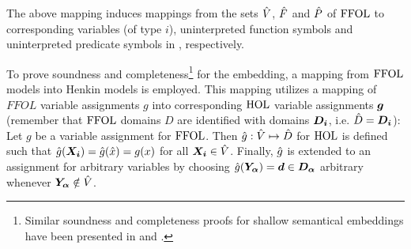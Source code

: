 The above mapping induces mappings from the sets $\hat{V}$, $\hat{F}$ and $\hat{P}$
of $\text{\textrm{FFOL}}$ to corresponding variables (of type $i$), uninterpreted function
symbols and uninterpreted predicate symbols in \HOL, respectively.

To prove soundness and completeness\footnote{Similar soundness and completeness proofs for
  shallow semantical embeddings have been presented in \cite{C37} and
  \cite{J31}.} for the embedding, a
mapping from $\text{\textrm{FFOL}}$ models into Henkin models is
employed.
This mapping utilizes a mapping of $FFOL$ variable
assignments $g$ into corresponding $\text{\textrm{HOL}}$ variable assignments
$\boldsymbol{g}$ (remember that $\text{\textrm{FFOL}}$  domains $D$ are  identified with 
\HOL domains $\boldsymbol{D_i}$, i.e. $\hat{D} = \boldsymbol{D_i}$): Let $g$ be a variable assignment for
  $\text{\textrm{FFOL}}$.  Then $\hat{g}:
  \hat{V}\mapsto \hat{D}$ for $\text{\textrm{HOL}}$ is defined such that
  $\hat{g}(\boldsymbol{X_i}) = \hat{g}(\hat{x}) = g(x)$ 
for all $\boldsymbol{X_i}\in \hat{V}$. 
Finally, $\hat{g}$ is extended to an assignment for arbitrary
variables by choosing
$\hat{g}(\boldsymbol{Y_\alpha}) = \boldsymbol{d}\in \boldsymbol{D_\alpha}$ arbitrary 
whenever $\boldsymbol{Y_\alpha} \notin \hat{V}$.

